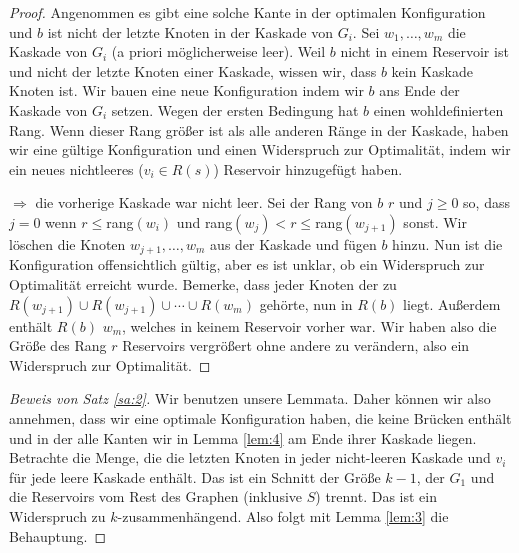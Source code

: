 \documentclass[12pt,a4paper]{scrartcl}
\numberwithin{equation}{section} %
\theoremstyle{definition}
\theoremstyle{plain}
\begin{document}
\begin{proof}
Angenommen es gibt eine solche Kante in der optimalen Konfiguration und $b$ ist nicht der letzte Knoten in der Kaskade von $G_i$. Sei $w_1,\dotsc, w_m$ die Kaskade von $G_i$ (a priori möglicherweise leer). Weil $b$ nicht in einem Reservoir ist und nicht der letzte Knoten einer Kaskade, wissen wir, dass $b$ kein Kaskade Knoten ist. Wir bauen eine neue Konfiguration indem wir $b$ ans Ende der Kaskade von $G_i$ setzen. Wegen der ersten Bedingung hat $b$ einen wohldefinierten Rang. Wenn dieser Rang größer ist als alle anderen Ränge in der Kaskade, haben wir eine gültige Konfiguration und einen Widerspruch zur Optimalität, indem wir ein neues nichtleeres ($v_i\in R(s)$) Reservoir hinzugefügt haben. \par $\Rightarrow$ die vorherige Kaskade war nicht leer. Sei der Rang von $b$ $r$ und $j\ge 0$ so, dass $j=0$ wenn $r\le$rang$(w_i)$ und rang$(w_j)<r\le$rang$(w_{j+1})$ sonst. Wir löschen die Knoten $w_{j+1},\dotsc,w_m$ aus der Kaskade und fügen $b$ hinzu. Nun ist die Konfiguration offensichtlich gültig, aber es ist unklar, ob ein Widerspruch zur Optimalität erreicht wurde. Bemerke, dass jeder Knoten der zu $R(w_{j+1})\cup R(w_{j+1})\cup\dotsb\cup R(w_m)$ gehörte, nun in $R(b)$ liegt. Außerdem enthält $R(b)$ $w_m$, welches in keinem Reservoir vorher war. Wir haben also die Größe des Rang $r$ Reservoirs vergrößert ohne andere zu verändern, also ein Widerspruch zur Optimalität.
\end{proof}
\begin{proof}[Beweis von Satz \ref{sa:2}]
Wir benutzen unsere Lemmata. Daher können wir also annehmen, dass wir eine optimale Konfiguration haben, die keine Brücken enthält und in der alle Kanten wir in Lemma \ref{lem:4} am Ende ihrer Kaskade liegen. Betrachte die Menge, die die letzten Knoten in jeder nicht-leeren Kaskade und $v_i$ für jede leere Kaskade enthält. Das ist ein Schnitt der Größe $k-1$, der $G_1$ und die Reservoirs vom Rest des Graphen (inklusive $S$) trennt. Das ist ein Widerspruch zu $k$-zusammenhängend. Also folgt mit Lemma \ref{lem:3} die Behauptung.
\end{proof}
\end{document}
